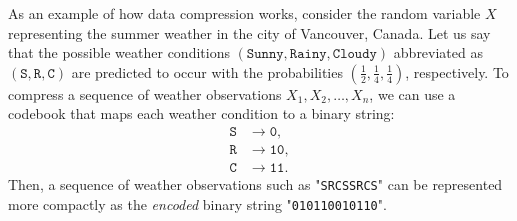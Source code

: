 As an example of how data compression works, consider the random variable $X$ representing the summer weather in the city of Vancouver, Canada.
Let us say that the %
possible weather conditions
$(\texttt{Sunny}, \texttt{Rainy}, \texttt{Cloudy})$ abbreviated as
$(\texttt{S}, \texttt{R}, \texttt{C})$ are predicted to occur with the probabilities
$(\frac{1}{2}, \frac{1}{4}, \frac{1}{4})$, respectively.
To compress a sequence of weather observations $X_1, X_2, \ldots, X_n$, we can use a codebook that maps each weather condition to a binary string:
\begin{align*}
  \texttt{S} &\rightarrow \texttt{0}, \\
  \texttt{R} &\rightarrow \texttt{10}, \\
  \texttt{C} &\rightarrow \texttt{11}.
\end{align*}
Then, a sequence of weather observations such as "\texttt{SRCSSRCS}" can be represented more compactly as the \emph{encoded} binary string "\texttt{010110010110}".
%

